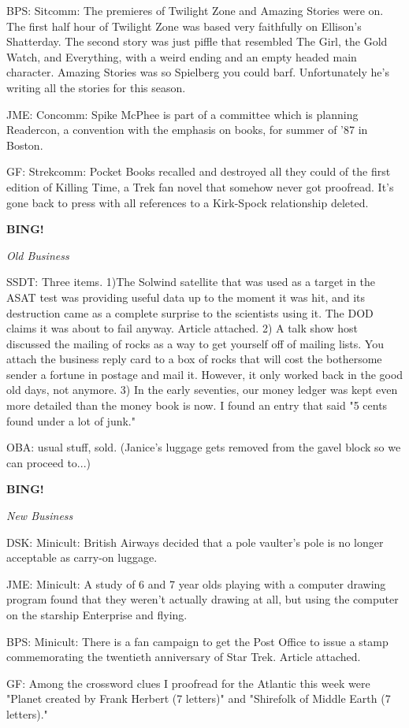 \documentclass[12pt]{article}
\newcommand{\bing}{{\bf BING!} }
\newcommand{\goto}[1]{\bing \vskip 12pt \centerline{{\em{#1}}}}
\begin{document}
BPS: Sitcomm: The premieres of Twilight Zone and Amazing Stories were on. The first half hour of Twilight Zone was based very faithfully on Ellison's Shatterday. The second story was just piffle that resembled The Girl, the Gold Watch, and Everything, with a weird ending and an empty headed main character. Amazing Stories was so Spielberg you could barf. Unfortunately he's writing all the stories for this season.

JME: Concomm: Spike McPhee is part of a committee which is planning Readercon, a convention with the emphasis on books, for summer of '87 in Boston.

GF: Strekcomm: Pocket Books recalled and destroyed all they could of the first edition of Killing Time, a Trek fan novel that somehow never got proofread. It's gone back to press with all references to a Kirk-Spock relationship deleted.

\goto{Old Business}

SSDT: Three items. 1)The Solwind satellite that was used as a target in the ASAT test was providing useful data up to the moment it was hit, and its destruction came as a complete surprise to the scientists using it. The DOD claims it was about to fail anyway. Article attached. 2) A talk show host discussed the mailing of rocks as a way to get yourself off of mailing lists. You attach the business reply card to a box of rocks that will cost the bothersome sender a fortune in postage and mail it. However, it only worked back in the good old days, not anymore. 3) In the early seventies, our money ledger was kept even more detailed than the money book is now. I found an entry that said "5 cents found under a lot of junk."

OBA: usual stuff, sold. (Janice's luggage gets removed from the gavel block so we can proceed to...)

\goto{New Business}

DSK: Minicult: British Airways decided that a pole vaulter's pole is no longer acceptable as carry-on luggage.

JME: Minicult: A study of 6 and 7 year olds playing with a computer drawing program found that they weren't actually drawing at all, but using the computer on the starship Enterprise and flying.

BPS: Minicult: There is a fan campaign to get the Post Office to issue a stamp commemorating the twentieth anniversary of Star Trek. Article attached.

GF: Among the crossword clues I proofread for the Atlantic this week were "Planet created by Frank Herbert (7 letters)" and "Shirefolk of Middle Earth (7 letters)."
\end{document}
